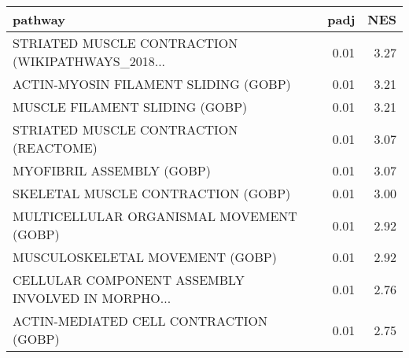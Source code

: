 \begin{tabular}{lrr}
\toprule
                                           pathway &  padj &   NES \\
\midrule
 STRIATED MUSCLE CONTRACTION (WIKIPATHWAYS\_2018... &  0.01 &  3.27 \\
              ACTIN-MYOSIN FILAMENT SLIDING (GOBP) &  0.01 &  3.21 \\
                    MUSCLE FILAMENT SLIDING (GOBP) &  0.01 &  3.21 \\
            STRIATED MUSCLE CONTRACTION (REACTOME) &  0.01 &  3.07 \\
                         MYOFIBRIL ASSEMBLY (GOBP) &  0.01 &  3.07 \\
                SKELETAL MUSCLE CONTRACTION (GOBP) &  0.01 &  3.00 \\
          MULTICELLULAR ORGANISMAL MOVEMENT (GOBP) &  0.01 &  2.92 \\
                   MUSCULOSKELETAL MOVEMENT (GOBP) &  0.01 &  2.92 \\
 CELLULAR COMPONENT ASSEMBLY INVOLVED IN MORPHO... &  0.01 &  2.76 \\
            ACTIN-MEDIATED CELL CONTRACTION (GOBP) &  0.01 &  2.75 \\
\bottomrule
\end{tabular}
